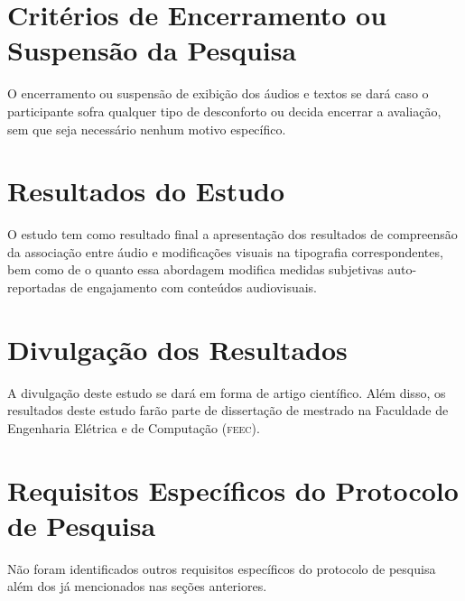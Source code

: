 \documentclass[a4paper,11pt,titlepage,singlespacing]{article}
\begin{document}
\section{Critérios de Encerramento ou Suspensão da Pesquisa}
\noindent O encerramento ou suspensão de exibição dos áudios e textos se dará caso o participante sofra qualquer tipo de desconforto ou decida encerrar a avaliação, sem que seja necessário nenhum motivo específico. 

\section{Resultados do Estudo}
\noindent O estudo tem como resultado final a apresentação dos resultados de compreensão da associação entre áudio e modificações visuais na tipografia correspondentes, bem como de o quanto essa abordagem modifica medidas subjetivas auto-reportadas de engajamento com conteúdos audiovisuais.

\section{Divulgação dos Resultados}
\noindent A divulgação deste estudo se dará em forma de artigo científico. Além disso, os resultados deste estudo farão parte de dissertação de mestrado na Faculdade de Engenharia Elétrica e de Computação (\textsc{feec}).

\section{Requisitos Específicos do Protocolo de Pesquisa}
\noindent Não foram identificados outros requisitos específicos do protocolo de pesquisa além dos já mencionados nas seções anteriores.







\newpage
{}

\end{document}

